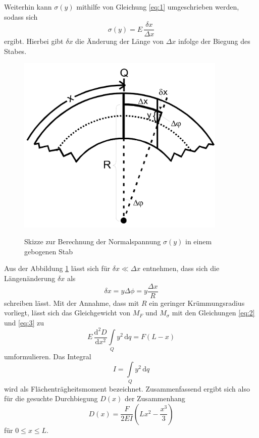 Weiterhin kann $\sigma (y)$
mithilfe von Gleichung \ref{eq:1} umgeschrieben werden,
sodass sich 
\begin{equation}
    \sigma (y) = E \, \frac{\delta x}{\Delta x}
    \label{eq:4}
\end{equation}
\noindent ergibt. Hierbei gibt $\delta x$ die 
Änderung der Länge von $\Delta x$ infolge der
Biegung des Stabes.
 

\begin{figure}[h]
    \centering
    \includegraphics[width=10cm]{Theorie4.png}
    \label{fig:theorie4}
    \caption{Skizze zur Berechnung der Normalspannung $\sigma (y)$ in einem gebogenen Stab}
\end{figure}

\noindent
Aus der Abbildung \ref{fig:theorie4} lässt sich für 
$\delta x \ll \Delta x$ entnehmen, dass sich 
die Längenänderung $\delta x$ als 
\begin{equation}
    \delta x = y \Delta \phi = y \frac{\Delta x}{R}
    \label{eq:5}
\end{equation}
\noindent schreiben lässt. Mit der Annahme, dass mit 
$R$ ein geringer Krümmungsradius vorliegt, lässt sich
das Gleichgewicht von $M_F$ und $M_{\sigma}$ mit den
Gleichungen \ref{eq:2} und \ref{eq:3} zu 
\begin{equation}
    E\, \frac{\mathrm{d}^2 D}{\mathrm{d} x^2} \int\limits_Q \! y^2\, \mathrm{d}q = F(L-x)
    \label{eq:6}
\end{equation}
\noindent umformulieren. Das Integral
\begin{equation}
    I = \int\limits_Q \! y^2\, \mathrm{d}q
    \label{eq:7}
\end{equation}
\noindent wird als Flächenträgheitsmoment bezeichnet.
Zusammenfassend ergibt sich also für die gesuchte 
Durchbiegung $D(x)$ der Zusammenhang
\begin{equation}
    D(x) = \frac{F}{2 E I} \left( L x^2 - \frac{x^3}{3} \right)
    \label{eq:8}
\end{equation}
\noindent für $0 \leq x \leq L$.




